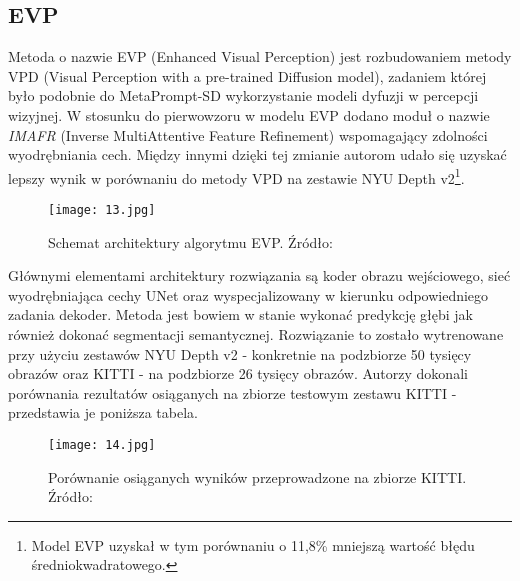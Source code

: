 \subsection{EVP}
Metoda o nazwie EVP \cite{lavreniuk2023} (Enhanced Visual Perception) jest rozbudowaniem metody VPD \cite{zhao2023} (Visual Perception with a pre-trained Diffusion model), zadaniem której było podobnie do MetaPrompt-SD wykorzystanie modeli dyfuzji w percepcji wizyjnej. W stosunku do pierwowzoru w modelu EVP dodano moduł o nazwie \textit{IMAFR} (Inverse MultiAttentive Feature Refinement) wspomagający zdolności wyodrębniania cech. Między innymi dzięki tej zmianie autorom udało się uzyskać lepszy wynik w porównaniu do metody VPD na zestawie NYU Depth v2\footnote{Model EVP uzyskał w tym porównaniu o 11,8\% mniejszą wartość błędu średniokwadratowego.}.
\begin{figure}[H]
    \centering
    \texttt{[image: 13.jpg]}
    \caption{Schemat architektury algorytmu EVP. Źródło: \cite{lavreniuk2023}}
    \label{fig:evp-schema}
\end{figure}
Głównymi elementami architektury rozwiązania są koder obrazu wejściowego, sieć wyodrębniająca cechy UNet oraz wyspecjalizowany w kierunku odpowiedniego zadania dekoder. Metoda jest bowiem w stanie wykonać predykcję głębi jak również dokonać segmentacji semantycznej. Rozwiązanie to zostało wytrenowane przy użyciu zestawów NYU Depth v2 - konkretnie na podzbiorze 50 tysięcy obrazów oraz KITTI - na podzbiorze 26 tysięcy obrazów. Autorzy dokonali porównania rezultatów osiąganych na zbiorze testowym zestawu KITTI - przedstawia je poniższa tabela.
\begin{figure}[H]
    \centering
    \texttt{[image: 14.jpg]}
    \caption{Porównanie osiąganych wyników przeprowadzone na zbiorze KITTI. Źródło: \cite{lavreniuk2023}}
    \label{fig:evp-results}
\end{figure}

